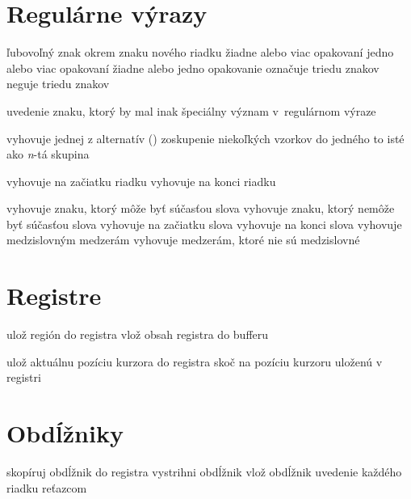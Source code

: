 \section{Regulárne výrazy}

 ľubovoľný znak okrem znaku nového riadku
\key{*} žiadne alebo viac opakovaní
\key{+} jedno alebo viac opakovaní
 žiadne alebo jedno opakovanie
\key{[$\ldots$]} označuje triedu znakov
\key{[\^{}$\ldots$]} neguje triedu znakov

 uvedenie znaku, ktorý by mal inak špeciálny význam
v~regulárnom výraze

\key{$\ldots$\\|$\ldots$\\|$\ldots$} vyhovuje jednej z alternatív ()
\key{\\( $\ldots$ \\)} zoskupenie niekoľkých vzorkov do jedného
 to isté ako {\it n\/}-tá skupina

\key{\^{}} vyhovuje na začiatku riadku
\key{\$} vyhovuje na konci riadku

\key{\\w} vyhovuje znaku, ktorý môže byť súčasťou slova
\key{\\W} vyhovuje znaku, ktorý nemôže byť súčasťou slova
\key{\\<} vyhovuje na začiatku slova
\key{\\>} vyhovuje na konci slova
\key{\\b} vyhovuje medzislovným medzerám
\key{\\B} vyhovuje medzerám, ktoré nie sú medzislovné

\section{Registre}

 ulož región do registra
 vlož obsah registra do bufferu

 ulož aktuálnu pozíciu kurzora do registra
 skoč na pozíciu kurzoru uloženú v registri

\section{Obdĺžniky}

 skopíruj obdĺžnik do registra
 vystrihni obdĺžnik
 vlož obdĺžnik
 uvedenie každého riadku reťazcom


